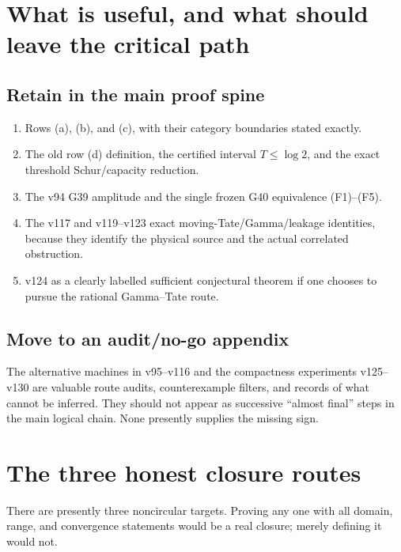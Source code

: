 \documentclass[11pt]{article}
\begin{document}
\section{What is useful, and what should leave the critical path}

\subsection*{Retain in the main proof spine}
\begin{enumerate}
\item Rows (a), (b), and (c), with their category boundaries stated exactly.
\item The old row (d) definition, the certified interval \(T\leq\log2\), and the
      exact threshold Schur/capacity reduction.
\item The v94 G39 amplitude and the single frozen G40 equivalence
      (F1)--(F5).
\item The v117 and v119--v123 exact moving-Tate/Gamma/leakage identities, because
      they identify the physical source and the actual correlated obstruction.
\item v124 as a clearly labelled sufficient conjectural theorem if one
      chooses to pursue the rational Gamma--Tate route.
\end{enumerate}

\subsection*{Move to an audit/no-go appendix}
The alternative machines in v95--v116 and the compactness experiments v125--v130
are valuable route audits, counterexample filters, and records of what cannot be
inferred.  They should not appear as successive ``almost final'' steps in the main
logical chain.  None presently supplies the missing sign.

\section{The three honest closure routes}

There are presently three noncircular targets.  Proving any one with all domain,
range, and convergence statements would be a real closure; merely defining it
would not.
\end{document}
